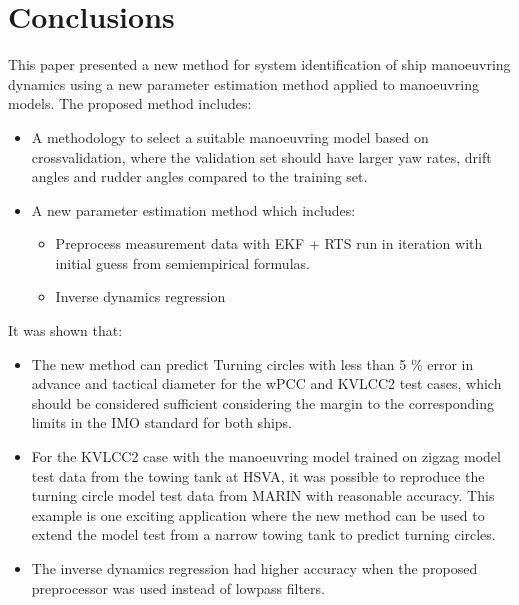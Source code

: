 \documentclass[review]{elsarticle}
\begin{document}
\section{Conclusions}
\label{\detokenize{10.01_conclusions:conclusions}}\label{\detokenize{10.01_conclusions:id1}}\label{\detokenize{10.01_conclusions::doc}}
\sphinxAtStartPar
This paper presented a new method for system identification of ship manoeuvring dynamics using a new parameter estimation method  applied to manoeuvring models. The proposed method includes:
\begin{itemize}
\item {} 
\sphinxAtStartPar
A methodology to select a suitable manoeuvring model based on cross\sphinxhyphen{}validation, where the validation set should have larger yaw rates, drift angles and rudder angles compared to the training set.

\item {} 
\sphinxAtStartPar
A new parameter estimation method which includes:
\begin{itemize}
\item {} 
\sphinxAtStartPar
Preprocess measurement data with EKF + RTS run in iteration with initial guess from semi\sphinxhyphen{}empirical formulas.

\item {} 
\sphinxAtStartPar
Inverse dynamics regression

\end{itemize}

\end{itemize}

\sphinxAtStartPar
It was shown that:
\begin{itemize}
\item {} 
\sphinxAtStartPar
The new method can predict Turning circles with less than 5 \% error in advance and tactical diameter for the wPCC and KVLCC2 test cases, which should be considered sufficient considering the margin to the corresponding limits in the IMO standard for both ships.

\item {} 
\sphinxAtStartPar
For the KVLCC2 case with the manoeuvring model trained on zigzag model test data from the towing tank at HSVA, it was possible to reproduce the turning circle model test data from MARIN with reasonable accuracy. This example is one exciting application where the new method can be used to extend the model test from a narrow towing tank to predict turning circles.

\item {} 
\sphinxAtStartPar
The inverse dynamics regression had higher accuracy when the proposed preprocessor was used instead of low\sphinxhyphen{}pass filters.

\end{itemize}
\end{document}
